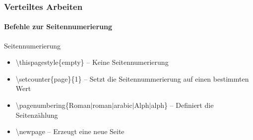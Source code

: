 \begin{frame}
\frametitle{Verteiltes Arbeiten}
\framesubtitle{Befehle zur Seitennumerierung}
\begin{block}{Seitennumerierung}
\begin{itemize}
\item \color{nounibaredI}\textbackslash thispagestyle\color{black}\{empty\} -- Keine Seitennumerierung
\item \color{nounibaredI}\textbackslash setcounter\color{black}\{page\}\{1\} -- Setzt die Seitennummerierung auf einen bestimmten Wert
\item \color{nounibaredI}\textbackslash pagenumbering\color{black}\{Roman$\mid$roman$\mid$arabic$\mid$Alph$\mid$alph\} -- Definiert die Seitenz\"ahlung
\item \color{nounibaredI}\textbackslash  newpage \color{black}-- Erzeugt eine neue Seite
\end{itemize}
\end{block}
\end{frame}
